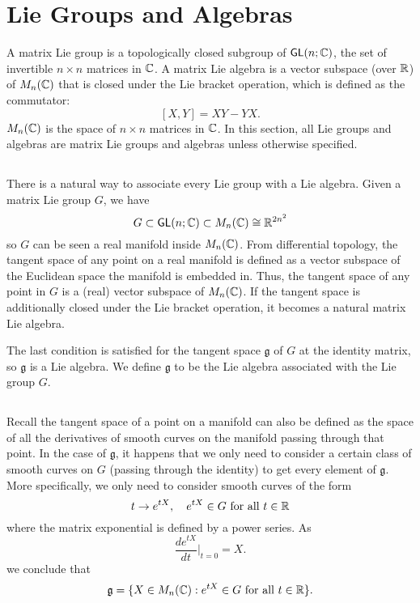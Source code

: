 \section{Lie Groups and Algebras}
A matrix Lie group is a topologically closed subgroup of $\operatorname{\textsf{GL}}(n; {\mathbb C})$, the set of invertible $n \times n$ matrices in ${\mathbb C}$. A matrix Lie algebra is a vector subspace (over ${\mathbb R}$) of $M_n({\mathbb C})$ that is closed under the Lie bracket operation, which is defined as the commutator:
\[
    [X, Y] = XY - YX.
\]
$M_n({\mathbb C})$ is the space of $n \times n$ matrices in ${\mathbb C}$. In this section, all Lie groups and algebras are matrix Lie groups and algebras unless otherwise specified.

\subsection{}
There is a natural way to associate every Lie group with a Lie algebra. Given a matrix Lie group $G$, we have
\[
    G \subset \operatorname{\textsf{GL}}(n; {\mathbb C}) \subset M_n({\mathbb C}) \cong {\mathbb R}^{2n^2}
\]
so $G$ can be seen a real manifold inside $M_n({\mathbb C})$. From differential topology, the tangent space of any point on a real manifold is defined as a vector subspace of the Euclidean space the manifold is embedded in. Thus, the tangent space of any point in $G$ is a (real) vector subspace of $M_n({\mathbb C})$. If the tangent space is additionally closed under the Lie bracket operation, it becomes a natural matrix Lie algebra.

The last condition is satisfied for the tangent space $\mathfrak g$ of $G$ at the identity matrix, so $\mathfrak g$ is a Lie algebra. We define $\mathfrak g$ to be the Lie algebra associated with the Lie group $G$.

\subsection{}
Recall the tangent space of a point on a manifold can also be defined as the space of all the derivatives of smooth curves on the manifold passing through that point. In the case of $\mathfrak g$, it happens that we only need to consider a certain class of smooth curves on $G$ (passing through the identity) to get every element of $\mathfrak g$. More specifically, we only need to consider smooth curves of the form
\[
    t \rightarrow e^{tX}, \quad e^{tX} \in G \text{ for all } t \in {\mathbb R}
\]
where the matrix exponential is defined by a power series. As
\[
    \frac{d e^{tX}}{dt} \Bigr|_{t = 0} = X.
\]
we conclude that
\[
    \mathfrak g = \{X \in M_n({\mathbb C}) : e^{tX} \in G \text{ for all } t \in {\mathbb R}\}.
\]


